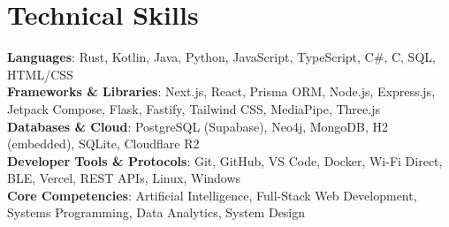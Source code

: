 \documentclass[a4paper,10pt]{article}
\begin{document}
\section{Technical Skills}
 \begin{itemize}[leftmargin=0.15in, label={}]
    \small{\item{
     \textbf{Languages}{: Rust, Kotlin, Java, Python, JavaScript, TypeScript, C\#, C, SQL, HTML/CSS} \\
     \textbf{Frameworks \& Libraries}{: Next.js, React, Prisma ORM, Node.js, Express.js, Jetpack Compose, Flask, Fastify, Tailwind CSS, MediaPipe, Three.js} \\
     \textbf{Databases \& Cloud}{: PostgreSQL (Supabase), Neo4j, MongoDB, H2 (embedded), SQLite, Cloudflare R2} \\
     \textbf{Developer Tools \& Protocols}{: Git, GitHub, VS Code, Docker, Wi-Fi Direct, BLE, Vercel, REST APIs, Linux, Windows} \\
     \textbf{Core Competencies}{: Artificial Intelligence, Full-Stack Web Development, Systems Programming, Data Analytics, System Design}
    }}
 \end{itemize}


\end{document}
